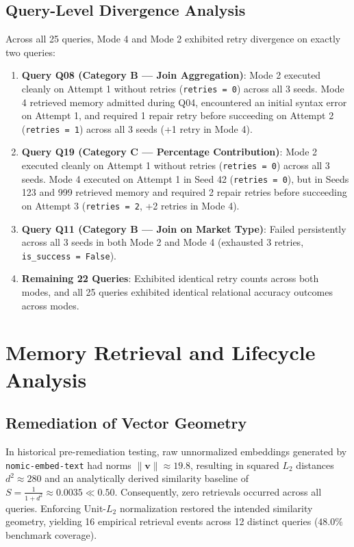 \documentclass[conference]{IEEEtran}
\begin{document}
\subsection{Query-Level Divergence Analysis}
Across all 25 queries, Mode 4 and Mode 2 exhibited retry divergence on exactly two queries:
\begin{enumerate}
    \item \textbf{Query Q08 (Category B --- Join Aggregation)}: Mode 2 executed cleanly on Attempt 1 without retries (\texttt{retries = 0}) across all 3 seeds. Mode 4 retrieved memory admitted during Q04, encountered an initial syntax error on Attempt 1, and required 1 repair retry before succeeding on Attempt 2 (\texttt{retries = 1}) across all 3 seeds (+1 retry in Mode 4).
    \item \textbf{Query Q19 (Category C --- Percentage Contribution)}: Mode 2 executed cleanly on Attempt 1 without retries (\texttt{retries = 0}) across all 3 seeds. Mode 4 executed on Attempt 1 in Seed 42 (\texttt{retries = 0}), but in Seeds 123 and 999 retrieved memory and required 2 repair retries before succeeding on Attempt 3 (\texttt{retries = 2}, +2 retries in Mode 4).
    \item \textbf{Query Q11 (Category B --- Join on Market Type)}: Failed persistently across all 3 seeds in both Mode 2 and Mode 4 (exhausted 3 retries, \texttt{is\_success = False}).
    \item \textbf{Remaining 22 Queries}: Exhibited identical retry counts across both modes, and all 25 queries exhibited identical relational accuracy outcomes across modes.
\end{enumerate}

\section{Memory Retrieval and Lifecycle Analysis}

\subsection{Remediation of Vector Geometry}
In historical pre-remediation testing, raw unnormalized embeddings generated by \texttt{nomic-embed-text} had norms $\|\mathbf{v}\| \approx 19.8$, resulting in squared $L_2$ distances $d^2 \approx 280$ and an analytically derived similarity baseline of $S = \frac{1}{1 + d^2} \approx 0.0035 \ll 0.50$. Consequently, zero retrievals occurred across all queries. Enforcing Unit-$L_2$ normalization restored the intended similarity geometry, yielding 16 empirical retrieval events across 12 distinct queries ($48.0\%$ benchmark coverage).
\end{document}

